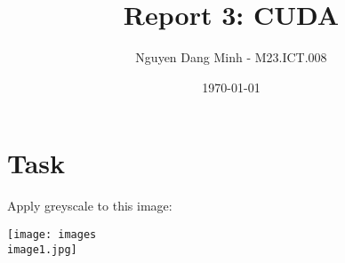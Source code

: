 \documentclass{article}
\title{Report 3: CUDA}
\author{Nguyen Dang Minh - M23.ICT.008}
\date{\today}
\begin{document}
\maketitle
\section{Task}
Apply greyscale to this image:

\texttt{[image: images\\image1.jpg]}
\end{document}
